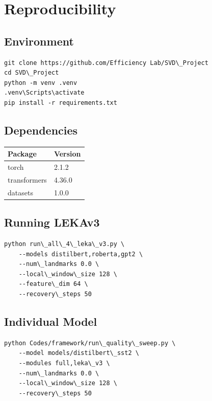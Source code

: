 \section{Reproducibility}

\subsection{Environment}

\begin{lstlisting}
git clone https://github.com/Efficiency Lab/SVD\_Project
cd SVD\_Project
python -m venv .venv
.venv\Scripts\activate
pip install -r requirements.txt
\end{lstlisting}

\subsection{Dependencies}

\begin{table}[H]
\centering
\small
\begin{tabular}{ll}
\toprule
\textbf{Package} & \textbf{Version} \\
\midrule
torch & 2.1.2 \\
transformers & 4.36.0 \\
datasets & 1.0.0 \\
\bottomrule
\end{tabular}
\end{table}

\subsection{Running LEKAv3}

\begin{lstlisting}
python run\_all\_4\_leka\_v3.py \
    --models distilbert,roberta,gpt2 \
    --num\_landmarks 0.0 \
    --local\_window\_size 128 \
    --feature\_dim 64 \
    --recovery\_steps 50
\end{lstlisting}

\subsection{Individual Model}

\begin{lstlisting}
python Codes/framework/run\_quality\_sweep.py \
    --model models/distilbert\_sst2 \
    --modules full,leka\_v3 \
    --num\_landmarks 0.0 \
    --local\_window\_size 128 \
    --recovery\_steps 50
\end{lstlisting}


